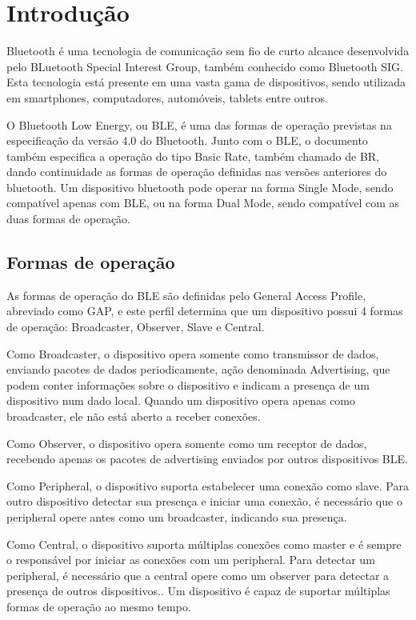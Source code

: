 \section{Introdução}

Bluetooth é uma tecnologia de comunicação sem fio de curto alcance desenvolvida
pelo BLuetooth Special Interest Group, também conhecido como Bluetooth SIG. Esta
tecnologia está presente em uma vasta gama de dispositivos, sendo utilizada em
smartphones, computadores, automóveis, tablets entre
outros.\cite{gomez2012overview}

O Bluetooth Low Energy, ou BLE, é uma das formas de operação previstas na
especificação da versão 4.0 do Bluetooth. Junto com o BLE, o documento também
especifica a operação do tipo Basic Rate, também chamado de BR, dando
continuidade as formas de operação definidas nas versões anteriores do
bluetooth.\cite{ble4core}
Um dispositivo bluetooth pode operar na forma Single Mode, sendo compatível
apenas com BLE, ou na forma Dual Mode, sendo compatível com as duas
formas de operação. \cite{ble4core}


\subsection{Formas de operação} %
As formas de operação do BLE são definidas pelo General Access Profile,
abreviado como GAP, e este perfil determina que um dispositivo possui 4 formas
de operação: Broadcaster, Observer, Slave e Central. \cite{ble4core}

Como Broadcaster, o dispositivo opera somente como transmissor de dados,
enviando pacotes de dados periodicamente, ação denominada Advertising, que
podem conter informações sobre o dispositivo e indicam a presença de um 
dispositivo num dado local. Quando um dispositivo opera apenas como
broadcaster, ele não está aberto a receber conexões.\cite{ble4core}

Como Observer, o dispositivo opera somente como um receptor de dados, recebendo
apenas os pacotes de advertising enviados por outros dispositivos
BLE.\cite{ble4core}

Como Peripheral, o dispositivo suporta estabelecer uma conexão como slave. Para
outro dispositivo detectar sua presença e iniciar uma conexão, é necessário que
o peripheral opere antes como um broadcaster, indicando sua
presença.\cite{ble4core}

Como Central, o dispositivo suporta múltiplas conexões como master e é sempre o
responsável por iniciar as conexões com um peripheral. Para detectar um
peripheral, é necessário que a central opere como um observer para detectar a
presença de outros dispositivos.\cite{ble4core}. Um dispositivo é capaz de
suportar múltiplas formas de operação ao mesmo tempo.\cite{ble4core}

